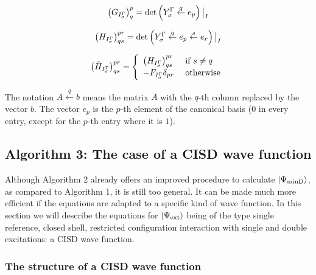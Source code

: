 \begin{equation}
  \big( G_{I_\sigma^{\Gamma}} \big)^p_q = \text{det} \left( Y_\sigma^{\Gamma} \overset{q}{\leftarrow} e_p \right) \big|_I
\end{equation}

\begin{equation}
  \big( H_{I_\sigma^{\Gamma}} \big)^{pr}_{qs} =
  \text{det} \left( Y_\sigma^{\Gamma} \overset{q}{\leftarrow} e_p
    \overset{s}{\leftarrow} e_r \right) \big|_I
\end{equation}

\begin{equation}
  \big( \tilde{H}_{I_\sigma^{\Gamma}} \big)^{pr}_{qs} =
  \left\{
    \begin{array}{ll}
      \big( H_{I_\sigma^{\Gamma}} \big)^{pr}_{qs} & \text{ if } s \ne q\\
      -F_{I_\sigma^{\Gamma}} \delta_{pr} & \text{ otherwise}
    \end{array}
  \right.
\end{equation}

The notation $A \overset{q}{\leftarrow}b$ means the matrix $A$ with the $q$-th column replaced by the vector $b$.
The vector $e_p$ is the $p$-th element of the canonical basis ($0$ in every entry, except for the $p
$-th entry where it is $1$).


\subsection{Algorithm 3: The case of a CISD wave function}

Although Algorithm 2 already offers an improved procedure to calculate $\ket{\Psi_\text{minD}}$, as compared to Algorithm 1, it is still too general.
It can be made much more efficient if the equations are adapted to a specific kind of wave function.
In this section we will describe the equations for $\ket{\Psi_\text{ext}}$ being of the type single reference, closed shell, restricted configuration interaction with single and double excitations: a CISD wave function.

\subsubsection{The structure of a CISD wave function}
\label{sec:struct_cisd_wf}

